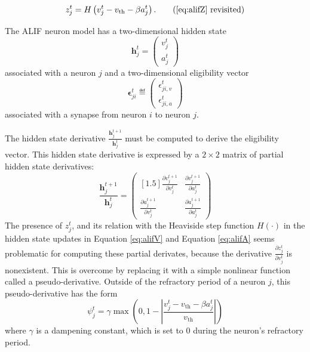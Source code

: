         \begin{equation*}
        z^t_j = H\left(v_j^t - v_\text{th} - \beta a^t_j\right). \tag{\ref{eq:alifZ} revisited}
        \end{equation*}

        The ALIF neuron model has a two-dimensional hidden state
        \begin{equation}
        \mathbf{h}^t_j = \begin{pmatrix}
        v^t_j\\
        a^t_j
        \end{pmatrix}
        \end{equation}
        associated with a neuron $j$ and a two-dimensional eligibility vector
        \begin{equation}
        \mathbf{\epsilon}^t_{ji} \eqdef \begin{pmatrix}
        \epsilon_{ji, v}^t\\
        \epsilon_{ji, a}^t
        \end{pmatrix}
        \end{equation}
        associated with a synapse from neuron $i$ to neuron $j$.

        The hidden state derivative $\frac{\mathbf{h}^{t+1}_j}{\mathbf{h}^t_j}$ must be computed to derive the eligibility vector.
        This hidden state derivative is expressed by a $2\times2$ matrix of partial hidden state derivatives:
        \begin{equation}
        \frac{\mathbf{h}^{t+1}_j}{\mathbf{h}^t_j} = \begin{pmatrix}[1.5]
        \frac{\partial v^{t+1}_j}{\partial v^t_j} & \frac{\partial v^{t+1}_j}{\partial a^t_j}\\
        \frac{\partial a^{t+1}_j}{\partial v^t_j} & \frac{\partial a^{t+1}_j}{\partial a^t_j}
        \end{pmatrix}
        \end{equation}
        The presence of $z^t_j$, and its relation with the Heaviside step function $H(\cdot)$ in the hidden state updates in Equation \ref{eq:alifV} and Equation \ref{eq:alifA} seems problematic for computing these partial derivates, because the derivative $\frac{\partial z^t_j}{\partial v^t_j}$ is nonexistent.
        This is overcome by replacing it with a simple nonlinear function called a pseudo-derivative.
        Outside of the refractory period of a neuron $j$, this pseudo-derivative has the form
        \begin{equation}
        \psi_j^t = \gamma \max\left(0, 1 - \left|\frac{v_j^t - v_\text{th} - \beta a^t_j}{v_\text{th}}\right|\right)
        \end{equation}
        where $\gamma$ is a dampening constant, which is set to 0 during the neuron's refractory period.

